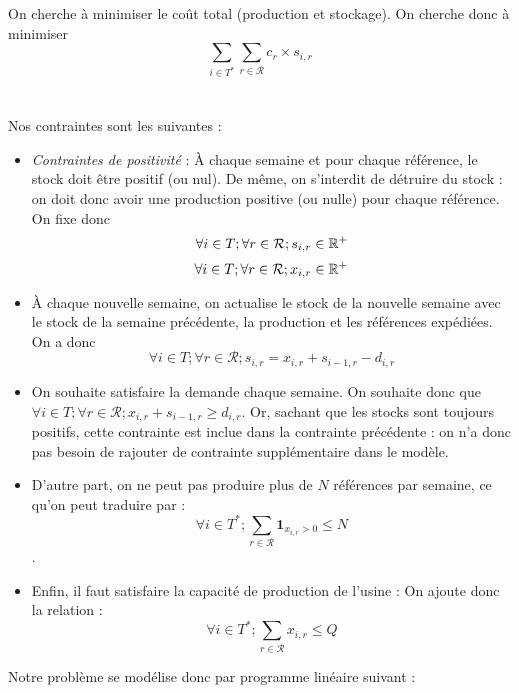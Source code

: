 \documentclass{rapport}
\begin{document}
On cherche à minimiser le coût total (production et stockage). On cherche donc à minimiser $$\sum_{i \in T^*} \sum_{r \in \mathcal{R}} c_r \times s_{i, r}$$ \\
\ \\
Nos contraintes sont les suivantes : \\
\begin{itemize}
\item \emph{Contraintes de positivité} : À chaque semaine et pour chaque référence, le stock doit être positif (ou nul).  De même, on s'interdit de détruire du stock : on doit donc avoir une production positive (ou nulle) pour chaque référence. On fixe donc $$\forall i \in T; \forall r \in \mathcal{R}; s_{i, r} \in \mathbb{R}^+$$ $$\forall i \in T; \forall r \in \mathcal{R}; x_{i, r} \in \mathbb{R}^+$$

\item À chaque nouvelle semaine, on actualise le stock de la nouvelle semaine avec le stock de la semaine précédente, la production et les références expédiées. On a donc $$\forall i \in T; \forall r \in \mathcal{R}; s_{i,r} = x_{i,r} + s_{i-1,r} - d_{i, r}$$
\item On souhaite satisfaire la demande chaque semaine. On souhaite donc que $\forall i \in T; \forall r \in \mathcal{R}; x_{i,r} + s_{i-1,r} \ge d_{i, r}$. Or, sachant que les stocks sont toujours positifs, cette contrainte est inclue dans la contrainte précédente : on n'a donc pas besoin de rajouter de contrainte supplémentaire dans le modèle.
\item D'autre part, on ne peut pas produire plus de $N$ références par semaine, ce qu'on peut traduire par : $$\forall i \in T^*; \sum_{r \in \mathcal{R}} \mathbf{1}_{x_{i, r} > 0} \le N$$.
\item Enfin, il faut satisfaire la capacité de production de l'usine : On ajoute donc la relation :
$$\forall i \in T^*; \sum_{r \in \mathcal{R}} x_{i, r} \le Q$$
\end{itemize}

Notre problème se modélise donc par programme linéaire suivant : \\
\ \\
\end{document}

